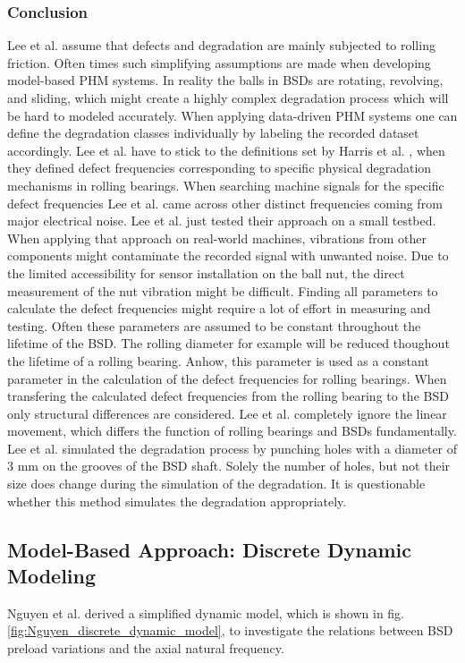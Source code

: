 \subsubsection{Conclusion}
Lee et al. assume that defects and degradation are mainly subjected to rolling friction. Often times such simplifying assumptions are made when developing model-based PHM systems. In reality the balls in BSDs are rotating, revolving, and sliding, which might create a highly complex degradation process which will be hard to modeled accurately. When applying data-driven PHM systems one can define the degradation classes individually by labeling the recorded dataset accordingly. Lee et al. have to stick to the definitions set by Harris et al. \cite{Harris1996}, when they defined defect frequencies corresponding to specific physical degradation mechanisms in rolling bearings. When searching machine signals for the specific defect frequencies Lee et al. came across other distinct frequencies coming from major electrical noise. Lee et al. just tested their approach on a small testbed. When applying that approach on real-world machines, vibrations from other components might contaminate the recorded signal with unwanted noise. Due to the limited accessibility for sensor installation on the ball nut, the direct measurement of the nut vibration might be difficult. Finding all parameters to calculate the defect frequencies might require a lot of effort in measuring and testing. Often these parameters are assumed to be constant throughout the lifetime of the BSD. The rolling diameter for example will be reduced thoughout the lifetime of a rolling bearing. Anhow, this parameter is used as a constant parameter in the calculation of the defect frequencies for rolling bearings. When transfering the calculated defect frequencies from the rolling bearing to the BSD only structural differences are considered. Lee et al. completely ignore the linear movement, which differs the function of rolling bearings and BSDs fundamentally. Lee et al. simulated the degradation process by punching holes with a diameter of 3 mm on the grooves of the BSD shaft. Solely the number of holes, but not their size does change during the simulation of the degradation. It is questionable whether this method simulates the degradation appropriately.  

\subsection{Model-Based Approach: Discrete Dynamic Modeling}
Nguyen et al. \cite{NGUYEN2019} derived a simplified dynamic model, which is shown in fig. \ref{fig:Nguyen_discrete_dynamic_model}, to investigate the relations between BSD preload variations and the axial natural frequency.


